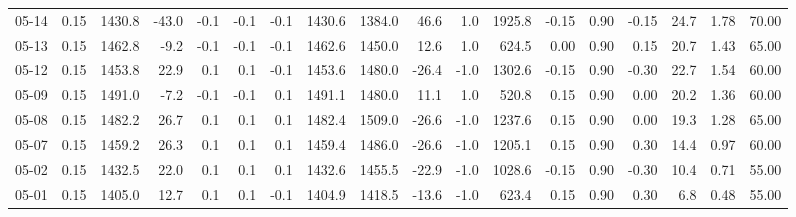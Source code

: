 \begin{threeparttable}
{\begin{tabular}{lrrrrrrrrrrrrrrrrr}
  05-14 &     0.15 & 1430.8 &             -43.0 &              -0.1 &               -0.1 &               -0.1 & 1430.6 & 1384.0 &       46.6 &                      1.0 &              1925.8 &      -0.15 &      0.90 &          -0.15 &             24.7 &            1.78 &                  70.00 \\
  05-13 &     0.15 & 1462.8 &              -9.2 &              -0.1 &               -0.1 &               -0.1 & 1462.6 & 1450.0 &       12.6 &                      1.0 &               624.5 &       0.00 &      0.90 &           0.15 &             20.7 &            1.43 &                  65.00 \\
  05-12 &     0.15 & 1453.8 &              22.9 &               0.1 &                0.1 &               -0.1 & 1453.6 & 1480.0 &      -26.4 &                     -1.0 &              1302.6 &      -0.15 &      0.90 &          -0.30 &             22.7 &            1.54 &                  60.00 \\
  05-09 &     0.15 & 1491.0 &              -7.2 &              -0.1 &               -0.1 &                0.1 & 1491.1 & 1480.0 &       11.1 &                      1.0 &               520.8 &       0.15 &      0.90 &           0.00 &             20.2 &            1.36 &                  60.00 \\
  05-08 &     0.15 & 1482.2 &              26.7 &               0.1 &                0.1 &                0.1 & 1482.4 & 1509.0 &      -26.6 &                     -1.0 &              1237.6 &       0.15 &      0.90 &           0.00 &             19.3 &            1.28 &                  65.00 \\
  05-07 &     0.15 & 1459.2 &              26.3 &               0.1 &                0.1 &                0.1 & 1459.4 & 1486.0 &      -26.6 &                     -1.0 &              1205.1 &       0.15 &      0.90 &           0.30 &             14.4 &            0.97 &                  60.00 \\
  05-02 &     0.15 & 1432.5 &              22.0 &               0.1 &                0.1 &                0.1 & 1432.6 & 1455.5 &      -22.9 &                     -1.0 &              1028.6 &      -0.15 &      0.90 &          -0.30 &             10.4 &            0.71 &                  55.00 \\
  05-01 &     0.15 & 1405.0 &              12.7 &               0.1 &                0.1 &               -0.1 & 1404.9 & 1418.5 &      -13.6 &                     -1.0 &               623.4 &       0.15 &      0.90 &           0.30 &              6.8 &            0.48 &                  55.00 \\

\end{tabular}}
\end{threeparttable}
